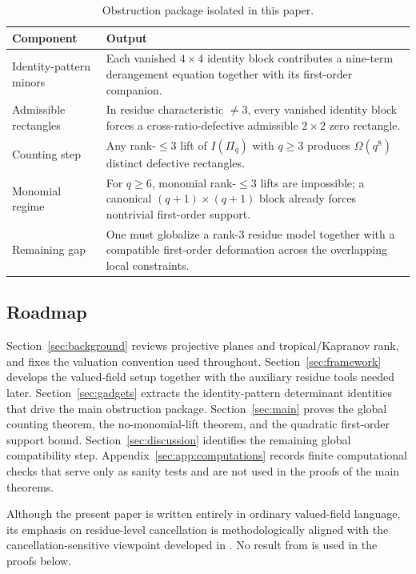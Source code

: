 \documentclass[11pt]{amsart}
\numberwithin{equation}{section}
\theoremstyle{plain}
\theoremstyle{definition}
\theoremstyle{remark}
\begin{document}
\begin{table}[htbp]
\caption{Obstruction package isolated in this paper.}
\label{tab:obstruction-package}
\centering
\small
\begin{tabular}{@{}p{}p{}@{}}
\toprule
Component & Output \\
\midrule
Identity-pattern minors & Each vanished $4\times4$ identity block contributes a nine-term derangement equation together with its first-order companion. \\
Admissible rectangles & In residue characteristic $\neq 3$, every vanished identity block forces a cross-ratio-defective admissible $2\times2$ zero rectangle. \\
Counting step & Any rank-$\le 3$ lift of $I(\Pi_q)$ with $q\ge 3$ produces $\Omega(q^8)$ distinct defective rectangles. \\
Monomial regime & For $q\ge 6$, monomial rank-$\le 3$ lifts are impossible; a canonical $(q+1)\times(q+1)$ block already forces nontrivial first-order support. \\
Remaining gap & One must globalize a rank-$3$ residue model together with a compatible first-order deformation across the overlapping local constraints. \\
\bottomrule
\end{tabular}
\end{table}

\subsection{Roadmap}
Section~\ref{sec:background} reviews projective planes and tropical/Kapranov rank, and fixes the valuation convention used throughout.
Section~\ref{sec:framework} develops the valued-field setup together with the auxiliary residue tools needed later.
Section~\ref{sec:gadgets} extracts the identity-pattern determinant identities that drive the main obstruction package.
Section~\ref{sec:main} proves the global counting theorem, the no-monomial-lift theorem, and the quadratic first-order support bound.
Section~\ref{sec:discussion} identifies the remaining global compatibility step.
Appendix~\ref{sec:app:computations} records finite computational checks that serve only as sanity tests and are not used in the proofs of the main theorems.

Although the present paper is written entirely in ordinary valued-field language, its emphasis on residue-level cancellation is methodologically aligned with the cancellation-sensitive viewpoint developed in \cite{Kim2026Hypernumber}. No result from \cite{Kim2026Hypernumber} is used in the proofs below.
\end{document}
